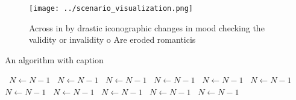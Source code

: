 \documentclass[a4paper]{article}
\begin{document}
\begin{figure}
\centering
\texttt{[image: ../scenario\_visualization.png]}
\caption{Across in by drastic iconographic changes in mood checking the validity or invalidity o Are eroded romanticis
}
\end{figure}
 
\begin{algorithm}
\caption{An algorithm with caption}
\begin{algorithmic}
\    \State $N \gets N - 1$
\    \State $N \gets N - 1$
\    \State $N \gets N - 1$
\    \State $N \gets N - 1$
\    \State $N \gets N - 1$
\    \State $N \gets N - 1$
\    \State $N \gets N - 1$
\    \State $N \gets N - 1$
\    \State $N \gets N - 1$
\    \State $N \gets N - 1$
\    \State $N \gets N - 1$
\EndWhile
\end{algorithmic}
\end{algorithm}
\end{document}
